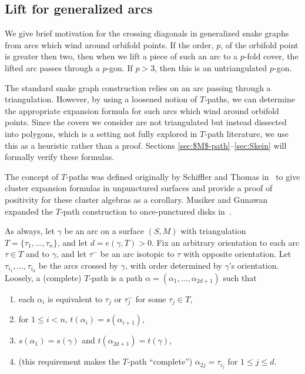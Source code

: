 \documentclass[pdftex]{sigma}%
\numberwithin{equation}{section}
\begin{document}
\subsection{Lift for generalized arcs}\label{subsec:LiftGenArc}

We give brief motivation for the crossing diagonals in generalized snake graphs from arcs which wind around orbifold points. If the order, $p$, of the orbifold point is greater then two, then when we lift a piece of such an arc to a $p$-fold cover, the lifted arc passes through a $p$-gon. If $p > 3$, then this is an untriangulated $p$-gon.

The standard snake graph construction relies on an arc passing through a triangulation. However, by using a loosened notion of $T$-paths, we can determine the appropriate expansion formula for such arcs which wind around orbifold points. Since the covers we consider are not triangulated but instead dissected into polygons, which is a setting not fully explored in $T$-path literature, we use this as a heuristic rather than a proof. Sections \ref{sec:$M$-path}--\ref{sec:Skein} will formally verify these formulas.

The concept of $T$-paths was defined originally by Schiffler and Thomas in~\cite{Schiffler-Thomas} to give cluster expansion formulas in unpunctured surfaces and provide a proof of positivity for these cluster algebras as a corollary. Musiker and Gunawan expanded the $T$-path construction to once-punctured disks in~\cite{Musiker-Gunawan}.

As always, let $\gamma$ be an arc on a surface $(S,M)$ with triangulation $T = \{\tau_1, \ldots, \tau_n\}$, and let $d = e(\gamma,T) > 0$. Fix an arbitrary orientation to each arc $\tau \in T$ and to $\gamma$, and let $\tau^-$ be an arc isotopic to $\tau$ with opposite orientation. Let $\tau_{i_1},\ldots, \tau_{i_d}$ be the arcs crossed by $\gamma$, with order determined by $\gamma$'s orientation. Loosely, a (complete) $T$-path is a path $\alpha = (\alpha_1,\ldots, \alpha_{2d+1})$ such that
\begin{enumerate}\itemsep=0pt
 \item[1)] each $\alpha_i$ is equivalent to $\tau_j$ or $\tau_j^-$ for some $\tau_j \in T$,
 \item[2)] for $1 \leq i < n$, $t(\alpha_i) = s(\alpha_{i+1})$,
 \item[3)] $s(\alpha_1) = s(\gamma)$ and $t(\alpha_{2d+1}) = t(\gamma)$,
 \item[4)] (this requirement makes the $T$-path ``complete'') $\alpha_{2j} = \tau_{i_j}$ for $1 \leq j \leq d$.
\end{enumerate}
\end{document}

